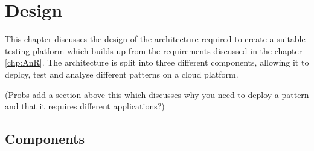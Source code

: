 \chapter{Design}\label{chap:design}





This chapter discusses the design of the architecture required to create a suitable testing platform which builds up from the requirements discussed in the chapter \ref{chp:AnR}. The architecture is split into three different components, allowing it to deploy, test and analyse different patterns on a cloud platform. 

(Probs add a section above this which discusses why you need to deploy a pattern and that it requires different applications?)
\section{Components}

